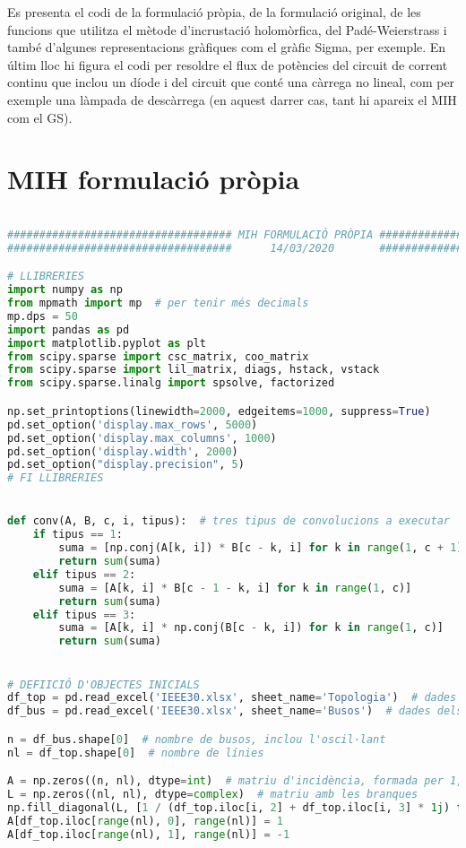 Es presenta el codi de la formulació pròpia, de la formulació original, de les funcions que utilitza el mètode d'incrustació holomòrfica, del Padé-Weierstrass i també d'algunes representacions gràfiques com el gràfic Sigma, per exemple. En últim lloc hi figura el codi per resoldre el flux de potències del circuit de corrent continu que inclou un díode i del circuit que conté una càrrega no lineal, com per exemple una làmpada de descàrrega (en aquest darrer cas, tant hi apareix el MIH com el GS).

\section{MIH formulació pròpia}
\begin{lstlisting}[language=Python,numbers=none]

################################### MIH FORMULACIÓ PRÒPIA ####################################
###################################      14/03/2020       ####################################

# LLIBRERIES
import numpy as np
from mpmath import mp  # per tenir més decimals
mp.dps = 50
import pandas as pd
import matplotlib.pyplot as plt
from scipy.sparse import csc_matrix, coo_matrix
from scipy.sparse import lil_matrix, diags, hstack, vstack
from scipy.sparse.linalg import spsolve, factorized

np.set_printoptions(linewidth=2000, edgeitems=1000, suppress=True)
pd.set_option('display.max_rows', 5000)
pd.set_option('display.max_columns', 1000)
pd.set_option('display.width', 2000)
pd.set_option("display.precision", 5)
# FI LLIBRERIES


def conv(A, B, c, i, tipus):  # tres tipus de convolucions a executar
    if tipus == 1:
        suma = [np.conj(A[k, i]) * B[c - k, i] for k in range(1, c + 1)]
        return sum(suma)
    elif tipus == 2:
        suma = [A[k, i] * B[c - 1 - k, i] for k in range(1, c)]
        return sum(suma)
    elif tipus == 3:
        suma = [A[k, i] * np.conj(B[c - k, i]) for k in range(1, c)]
        return sum(suma)


# DEFIICIÓ D'OBJECTES INICIALS
df_top = pd.read_excel('IEEE30.xlsx', sheet_name='Topologia')  # dades de topologia
df_bus = pd.read_excel('IEEE30.xlsx', sheet_name='Busos')  # dades dels busos

n = df_bus.shape[0]  # nombre de busos, inclou l'oscil·lant
nl = df_top.shape[0]  # nombre de línies

A = np.zeros((n, nl), dtype=int)  # matriu d'incidència, formada per 1, -1 i 0
L = np.zeros((nl, nl), dtype=complex)  # matriu amb les branques
np.fill_diagonal(L, [1 / (df_top.iloc[i, 2] + df_top.iloc[i, 3] * 1j) for i in range(nl)])
A[df_top.iloc[range(nl), 0], range(nl)] = 1
A[df_top.iloc[range(nl), 1], range(nl)] = -1


\end{lstlisting}
